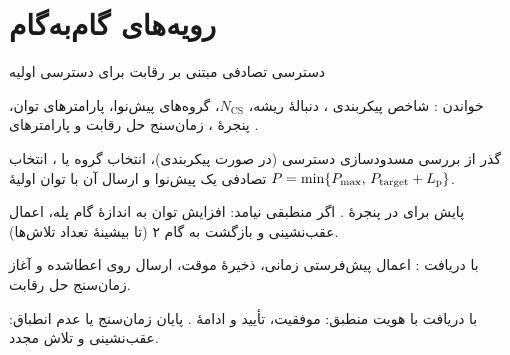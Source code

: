 \documentclass[11pt,a4paper]{article}
\begin{document}
\begin{acnfigure}
  \caption{پیش‌نوای قالب ۰. پیشوند چرخه‌ای تأخیر رفت‌وبرگشت () و گسترش تأخیر را جذب می‌کند؛ زمان محافظ
  نمی‌گذارد پیش‌نوای دیررس با زیرقاب بعدی هم‌پوشانی کند.}
  \label{fig:prach}
\end{acnfigure}

\section{رویه‌های گام‌به‌گام}
\begin{procedurebox}{دسترسی تصادفی مبتنی بر رقابت برای دسترسی اولیه}\label{proc:cbra}
\begin{steps}
  \item خواندن : شاخص پیکربندی ، دنبالهٔ ریشه، $N_{\mathrm{CS}}$، گروه‌های پیش‌نوا، پارامترهای
        توان، پنجرهٔ ، زمان‌سنج حل رقابت و پارامترهای .
  \item گذر از بررسی مسدودسازی دسترسی (در صورت پیکربندی)، انتخاب گروه  یا ، انتخاب تصادفی یک پیش‌نوا
        و ارسال آن با توان اولیهٔ $P = \min\{P_{\max},\,P_{\mathrm{target}} + L_{\mathrm{p}}\}$.
  \item پایش  برای  در پنجرهٔ . اگر  منطبقی نیامد: افزایش توان به
        اندازهٔ گام پله، اعمال عقب‌نشینی و بازگشت به گام ۲ (تا بیشینهٔ تعداد تلاش‌ها).
  \item با دریافت : اعمال پیش‌فرستی زمانی، ذخیرهٔ  موقت، ارسال  روی 
        اعطاشده و آغاز زمان‌سنج حل رقابت.
  \item با دریافت  با هویت منطبق: موفقیت، تأیید  و ادامهٔ . پایان زمان‌سنج یا عدم
        انطباق: عقب‌نشینی و تلاش مجدد.
\end{steps}
\end{procedurebox}

\begin{acnfigure}
  \caption{دسترسی تصادفی مبتنی بر رقابت (چهارمرحله‌ای) (\cref{proc:cbra}).}
  \label{fig:cbra}
\end{acnfigure}

\begin{acnfigure}
  \caption{دسترسی تصادفی بدون رقابت، مثلاً در تحویل.}
  \label{fig:cfra}
\end{acnfigure}
\end{document}
